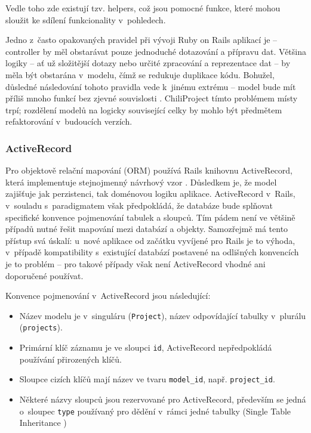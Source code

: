 \documentclass[thesis=B,czech]{FITthesis}[2012/05/02]
\begin{document}
Vedle toho zde existují tzv. helpers, což jsou pomocné funkce, které
mohou sloužit ke sdílení funkcionality v~pohledech.

Jedno z~často opakovaných pravidel při vývoji Ruby on Rails aplikací je
\citep{Buck2006} -- controller by měl
obstarávat pouze jednoduché dotazování a přípravu dat. Většina logiky --
ať už složitější dotazy nebo určité zpracování a reprezentace dat -- by
měla být obstarána v~modelu, čímž se redukuje duplikace kódu. Bohužel,
důsledné následování tohoto pravidla vede k~jinému extrému -- model bude mít
příliš mnoho funkcí bez zjevné souvislosti \citep{Libbery2011}.
ChiliProject tímto problémem místy trpí; rozdělení modelů na logicky
související celky \citep{Grimm2012} by mohlo být předmětem refaktorování
v~budoucích verzích.

\subsubsection{ActiveRecord}

Pro objektově relační mapování (ORM) používá Rails knihovnu
ActiveRecord, která implementuje stejnojmenný návrhový vzor \citep[str.
160]{Fowler2003}. Důsledkem je, že model zajišťuje jak perzistenci, tak doménovou logiku
aplikace. ActiveRecord v~Rails, v~souladu
s~paradigmatem  však předpokládá, že
databáze bude splňovat specifické konvence pojmenování tabulek a
sloupců. Tím pádem není ve většině případů nutné řešit mapování mezi
databází a objekty. Samozřejmě má tento přístup svá úskalí: u~nové
aplikace od začátku vyvíjené pro Rails je to výhoda, v~případě
kompatibility s~existující databází postavené na odlišných konvencích je
to problém -- pro takové případy však není ActiveRecord vhodné ani
doporučené používat.

Konvence pojmenování v~ActiveRecord jsou následující:
\begin{itemize}
\item Název modelu je v~singuláru (\lstinline!Project!), název odpovídající tabulky
v~plurálu (\lstinline!projects!).
\item Primární klíč záznamu je ve sloupci \lstinline!id!, ActiveRecord nepředpokládá používání přirozených
klíčů.
\item Sloupce cizích klíčů mají název ve tvaru \lstinline!model_id!,
např. \lstinline!project_id!.
\item Některé názvy sloupců jsou rezervované pro ActiveRecord, především se jedná o~sloupec \lstinline!type!
používaný pro dědění v~rámci jedné tabulky (Single Table Inheritance
\citep[str. 278]{Fowler2003})
\end{itemize}
\end{document}
